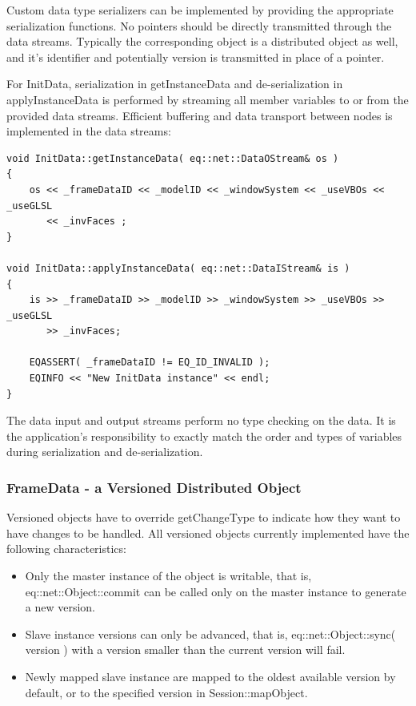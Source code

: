 \documentclass[10pt,a4]{scrartcl}
\begin{document}
Custom data type serializers can be implemented by providing the
appropriate serialization functions. No pointers should be directly
transmitted through the data streams. Typically the corresponding object
is a distributed object as well, and it's identifier and potentially
version is transmitted in place of a pointer.

For \textsf{InitData}, serialization in \textsf{getInstanceData}
and de-serialization in \textsf{applyInstanceData} is performed by
streaming all member variables to or from the provided data
streams. Efficient buffering and data transport between nodes is
implemented in the data streams:

{\footnotesize\begin{lstlisting}
void InitData::getInstanceData( eq::net::DataOStream& os )
{
    os << _frameDataID << _modelID << _windowSystem << _useVBOs << _useGLSL
       << _invFaces ;
}

void InitData::applyInstanceData( eq::net::DataIStream& is )
{
    is >> _frameDataID >> _modelID >> _windowSystem >> _useVBOs >> _useGLSL
       >> _invFaces;

    EQASSERT( _frameDataID != EQ_ID_INVALID );
    EQINFO << "New InitData instance" << endl;
}
\end{lstlisting}}%

The data input and output streams perform no type checking on the data.
It is the application's responsibility to exactly match the order and
types of variables during serialization and de-serialization.

\subsubsection{FrameData - a Versioned Distributed Object}

Versioned objects have to override \textsf{getChangeType} to indicate
how they want to have changes to be handled. All versioned objects
currently implemented have the following characteristics:

\begin{itemize}
\item Only the master instance of the object is writable, that is,
  \textsf{eq::net::Object::com\-mit} can be called only on the master
  instance to generate a new version.
\item Slave instance versions can only be advanced, that is,
  \textsf{eq::net::Object::sync( version )} with a version smaller than
  the current version will fail.
\item Newly mapped slave instance are mapped to the oldest available
  version by default, or to the specified version in
  \textsf{Session::mapObject}.
\end{itemize}
\end{document}
